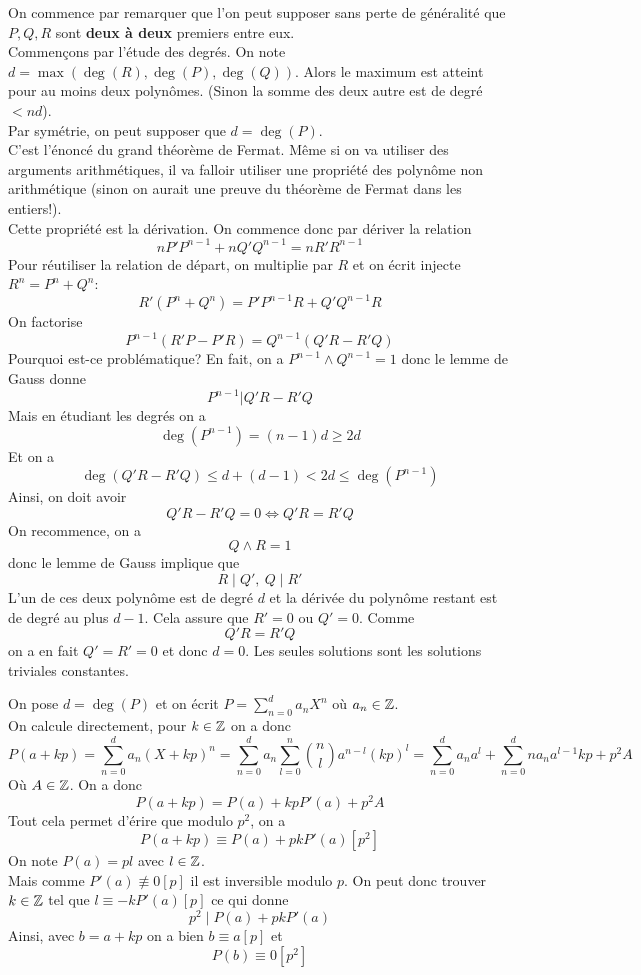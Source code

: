 \begin{sol}
On commence par remarquer que l'on peut supposer sans perte de généralité que $P,Q,R$ sont \textbf{deux à deux} premiers entre eux.
\\
Commençons par l'étude des degrés. On note $d=\max (\deg(R),\deg(P),\deg(Q))$. Alors le maximum est atteint pour au moins deux polynômes. (Sinon la somme des deux autre est de degré $<nd$).
\\
Par symétrie, on peut supposer que $d=\deg(P)$.
\\
C'est l'énoncé du grand théorème de Fermat. Même si on va utiliser des arguments arithmétiques, il va falloir utiliser une propriété des polynôme non arithmétique (sinon on aurait une preuve du théorème de Fermat dans les entiers!).
\\
Cette propriété est la dérivation. On commence donc par dériver la relation
$$nP'P^{n-1}+nQ'Q^{n-1}=nR'R^{n-1} $$
Pour réutiliser la relation de départ, on multiplie par $R$ et on écrit injecte $R^n=P^n+Q^n$:
$$R'(P^n+Q^n)=P'P^{n-1}R+Q'Q^{n-1}R $$
On factorise 
$$P^{n-1}(R'P-P'R)=Q^{n-1}(Q'R-R'Q) $$
Pourquoi est-ce problématique? En fait, on a $P^{n-1}\wedge Q^{n-1}=1$ donc le lemme de Gauss donne 
$$P^{n-1}|Q'R-R'Q $$
Mais en étudiant les degrés on a 
$$\deg(P^{n-1})=(n-1)d\geq 2d $$
Et on a
$$ \deg(Q'R-R'Q)\leq d+(d-1)<2d\leq \deg(P^{n-1})$$
Ainsi, on doit avoir 
$$Q'R-R'Q=0\iff Q'R=R'Q $$
On recommence, on a 
$$Q\wedge R=1 $$ donc le lemme de Gauss implique que 
$$R\mid Q', \: Q\mid R' $$
L'un de ces deux polynôme est de degré $d$ et la dérivée du polynôme restant est de degré au plus $d-1$. Cela assure que $R'=0$ ou $Q'=0$. Comme 
$$Q'R=R'Q $$ on a en fait $Q'=R'=0$ et donc $d=0$. Les seules solutions sont les solutions triviales constantes.
\end{sol}


\begin{sol}
On pose $d=\deg(P)$ et on écrit $P=\sum_{n=0}^da_nX^n$ où $a_n\in \mathbb Z$.
\\
On calcule directement, pour $k\in \mathbb Z$ on a donc 
$$P(a+kp)=\sum_{n=0}^da_n(X+kp)^n=\sum_{n=0}^da_n\sum_{l=0}^n\binom{n}{l}a^{n-l}(kp)^l =\sum_{n=0}^da_na^l+\sum_{n=0}^dna_na^{l-1}kp+p^2A$$
Où $A\in \mathbb Z$. On a donc 
$$P(a+kp)=P(a)+kpP'(a)+p^2A $$
Tout cela permet d'érire que modulo $p^2$, on a 
$$P(a+kp)\equiv P(a)+pkP'(a)[p^2] $$
On note $P(a)=pl$ avec $l\in \mathbb Z$.
\\
Mais comme $P'(a)\not\equiv 0[p]$ il est inversible modulo $p$. On peut donc trouver $k\in \mathbb Z$ tel que $l\equiv -kP'(a)[p]$ ce qui donne 
$$p^2\mid P(a)+pkP'(a) $$
Ainsi, avec $b=a+kp$ on a bien $b\equiv a[p]$ et 
$$P(b)\equiv 0[p^2] $$
\end{sol}

